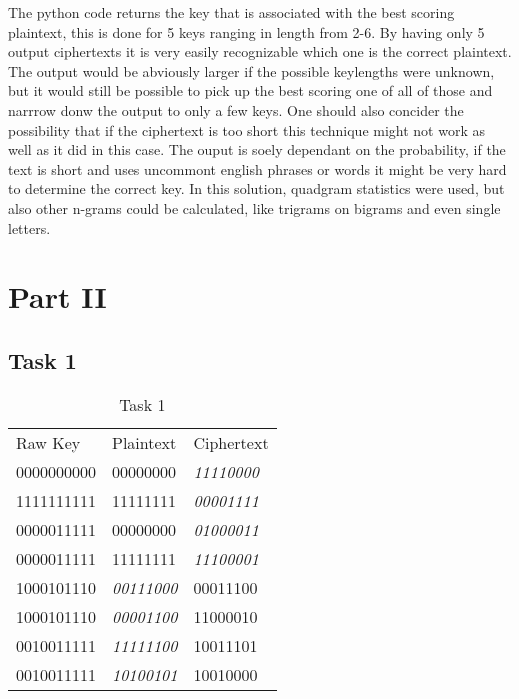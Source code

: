\documentclass[12pt]{report}
\begin{document}
\newpage
The python code returns the key that is associated with the best scoring plaintext, this is done for 5 keys ranging in length from 2-6. By having only 5 output ciphertexts it is very easily recognizable which one is the correct plaintext. The output would be abviously larger if the possible keylengths were unknown, but it would still be possible to pick up the best scoring one of all of those and narrrow donw the output to only a few keys. One should also concider the possibility that if the ciphertext is too short this technique might not work as well as it did in this case. The ouput is soely dependant on the probability, if the text is short and uses uncommont english phrases or words it might be very hard to determine the correct key. In this solution, quadgram statistics were used, but also other n-grams could be calculated, like trigrams on bigrams and even single letters.

\newpage
\section*{Part II}
\subsection*{Task 1}
\begin{table}[h]
  \centering
  \caption{Task 1}
  \begin{tabular}{|lll|}
    \cline{1-3}
    Raw Key & Plaintext & Ciphertext \\
   0000000000 & 00000000 & \emph{11110000} \\ 
   1111111111 & 11111111 & \emph{00001111} \\ 
   0000011111 & 00000000 & \emph{01000011} \\ 
   0000011111 & 11111111 & \emph{11100001} \\ 
   1000101110 & \emph{00111000} & 00011100 \\ 
   1000101110 & \emph{00001100} & 11000010 \\ 
   0010011111 & \emph{11111100} & 10011101 \\ 
   0010011111 & \emph{10100101} & 10010000 \\ \cline{1-3}
  \end{tabular}
\end{table}
\end{document}
